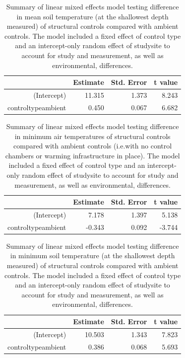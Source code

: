 \documentclass{article}
\begin{document}
\par
\begin{table}[ht]
\centering
\begin{tabular}{rrrr}
  \hline
 & Estimate & Std. Error & t value \\ 
  \hline
(Intercept) & 11.315 & 1.373 & 8.243 \\ 
  controltypeambient & 0.450 & 0.067 & 6.682 \\ 
   \hline
\end{tabular}
\caption{Summary of linear mixed effects model testing difference in mean soil temperature (at the shallowest depth measured) of structural controls compared with ambient controls. The model included a fixed effect of control type and an intercept-only random effect of studysite to account for study and measurement, as well as environmental, differences.} 
\end{table}
\par
\begin{table}[ht]
\centering
\begin{tabular}{rrrr}
  \hline
 & Estimate & Std. Error & t value \\ 
  \hline
(Intercept) & 7.178 & 1.397 & 5.138 \\ 
  controltypeambient & -0.343 & 0.092 & -3.744 \\ 
   \hline
\end{tabular}
\caption{Summary of linear mixed effects model testing difference in minimum air temperatures of structural controls compared with ambient controls (i.e.with no control chambers or warming infrastructure in place). The model included a fixed effect of control type and an intercept-only random effect of studysite to account for study and measurement, as well as environmental, differences.} 
\end{table}\par
\begin{table}[ht]
\centering
\begin{tabular}{rrrr}
  \hline
 & Estimate & Std. Error & t value \\ 
  \hline
(Intercept) & 10.503 & 1.343 & 7.823 \\ 
  controltypeambient & 0.386 & 0.068 & 5.693 \\ 
   \hline
\end{tabular}
\caption{Summary of linear mixed effects model testing difference in minimum soil temperature (at the shallowest depth measured) of structural controls compared with ambient controls. The model included a fixed effect of control type and an intercept-only random effect of studysite to account for study and measurement, as well as environmental, differences.} 
\end{table} 
\end{document}
